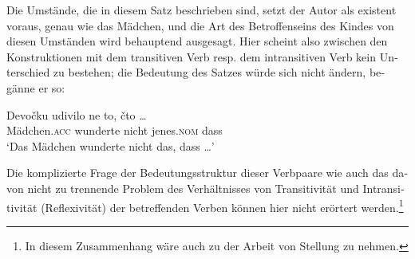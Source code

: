 \documentclass[output=paper]{langscibook}
\begin{document}
\begin{otherlanguage}{german}
\largerpage[2]
\noindent Die Umstände, die in diesem Satz beschrieben sind, setzt der Autor als exi\-stent voraus, genau wie das Mädchen, und die Art des Betroffenseins des Kindes von diesen Umständen wird behauptend ausgesagt. Hier scheint also zwischen den Konstruktionen mit dem transitiven Verb resp. dem intransitiven Verb kein Unterschied zu bestehen; die Bedeutung des Satzes würde sich nicht ändern, begänne er so:

    


\ea \label{ex:zi83:55}
    \gll Devočku udivilo ne to, čto … \\
    Mädchen.\textsc{acc} wunderte nicht jenes.\textsc{nom} dass  \\
    \glt ‘Das Mädchen wunderte nicht das, dass …’
\z

\noindent Die komplizierte Frage der Bedeutungsstruktur dieser Verbpaare wie auch das davon nicht zu trennende Problem des Verhältnisses von Transitivität und Intransitivität (Reflexivität) der betreffenden Verben können hier nicht erörtert werden.\footnote{In diesem Zusammenhang wäre auch zu der Arbeit von \citet[insbesondere 57 ff.]{norrick1978factive-adjectives-and-the-theory-of-factivity} Stellung zu nehmen.}


\end{otherlanguage}
\end{document}
